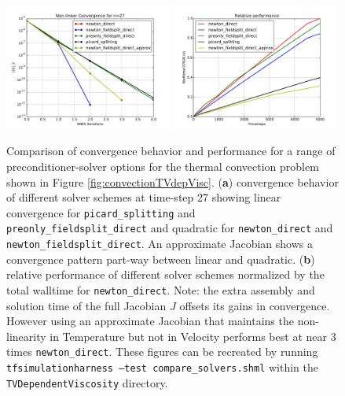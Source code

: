 \begin{figure}[htb]
  \centering
\includegraphics[width=0.49\textwidth]{figures/Solver_comparison_SNES_convergence_TVvisc.pdf}\hfill{}
\includegraphics[width=0.49\textwidth]{figures/Solver_comparison_Walltime_TVvisc.pdf}\\
  \caption{Comparison of convergence behavior and performance for a
    range of preconditioner-solver options for  the thermal
    convection problem shown in Figure \ref{fig:convectionTVdepVisc}.  
    (\textbf{a}) convergence behavior of different solver
    schemes at time-step 27 showing linear convergence for
    \texttt{picard\_splitting} and \texttt{preonly\_fieldsplit\_direct}
    and quadratic for \texttt{newton\_direct} and
    \texttt{newton\_fieldsplit\_direct}. An approximate Jacobian shows
    a convergence pattern part-way between linear and quadratic. (\textbf{b}) relative
    performance of different solver schemes normalized by the total
    walltime for \texttt{newton\_direct}. Note: the extra assembly and
    solution    time of the full Jacobian $J$ offsets its gains in
    convergence.  However using an approximate Jacobian that maintains
    the non-linearity in Temperature but not in Velocity performs best
  at near 3 times \texttt{newton\_direct}.  These figures can be
  recreated by running \texttt{tfsimulationharness --test
    compare\_solvers.shml} within the \texttt{TVDependentViscosity} directory.}
  \label{fig:Tvdependentvisc_conv_perf}
\end{figure}

 




